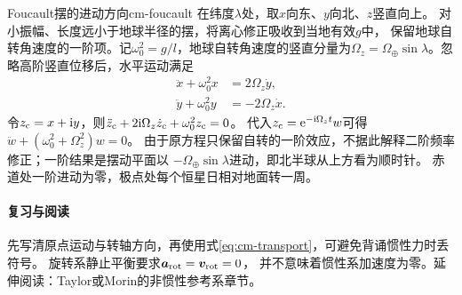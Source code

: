 \begin{example}{Foucault摆的进动方向}{cm-foucault}
在纬度$\lambda$处，取$x$向东、$y$向北、$z$竖直向上。
对小振幅、长度远小于地球半径的摆，将离心修正吸收到当地有效$g$中，
保留地球自转角速度的一阶项。记$\omega_0^2 = g/l$，地球自转角速度的竖直分量为$\Omega_z = \Omega_\oplus\sin\lambda$。忽略高阶竖直位移后，水平运动满足
\begin{subequations}
 \begin{align}
  \ddot x + \omega_0^2x &= 2\Omega_z\dot y,\\
  \ddot y + \omega_0^2y &= -2\Omega_z\dot x.
 \end{align}
\end{subequations}
令$z_{\mathrm c} = x + \mathrm{i} y$，则$\ddot z_{\mathrm c} + 2\mathrm{i}\Omega_z\dot z_{\mathrm c} + \omega_0^2z_{\mathrm c} = 0$。
代入$z_{\mathrm c} = \mathop{}\!\mathrm{e}^{-\mathrm{i}\Omega_z t}w$可得$\ddot w + (\omega_0^2 + \Omega_z^2)w = 0$。
由于原方程只保留自转的一阶效应，不据此解释二阶频率修正；一阶结果是摆动平面以
$-\Omega_\oplus\sin\lambda$进动，即北半球从上方看为顺时针。
赤道处一阶进动为零，极点处每个恒星日相对地面转一周。
\end{example}

\paragraph{复习与阅读}
先写清原点运动与转轴方向，再使用式\eqref{eq:cm-transport}，可避免背诵惯性力时丢符号。
旋转系静止平衡要求$\bm a_{\mathrm{rot}} = \bm v_{\mathrm{rot}} = 0$，
并不意味着惯性系加速度为零。延伸阅读：Taylor或Morin的非惯性参考系章节。
